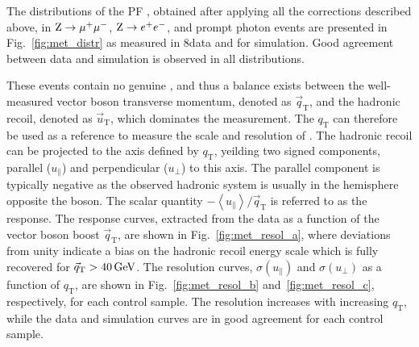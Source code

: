 The distributions of the PF \ETmiss, obtained after applying all the corrections described above, in $\mathrm{Z}\to\mu^+\mu^-$, $\mathrm{Z}\to e^+e^-$, and prompt photon events are presented in Fig.~\ref{fig:met_distr} as measured in 8\TeV data and for simulation. Good agreement between data and simulation is observed in all distributions.

These events contain no genuine \ptvecmiss, and thus a balance exists between the well-measured vector boson transverse momentum, denoted as ${\vec q}_\mathrm{T}$, and the hadronic recoil, denoted as ${\vec u}_\mathrm{T}$,  which dominates the \ptvecmiss measurement. The $q_\mathrm{T}$ can therefore be used as a reference to measure the scale and resolution of \ptvecmiss.
The hadronic recoil can be projected to the axis defined by $q_\mathrm{T}$, yeilding two signed components, parallel ($u_\parallel$) and perpendicular ($u_\perp$) to this axis. The parallel component is typically negative as the observed hadronic system is usually in the hemisphere opposite the boson. The scalar quantity $-\left\langle u_\parallel\right\rangle/{\vec q}_\mathrm{T}$ is referred to as the \ptvecmiss response. The response curves, extracted from the data as a function of the vector boson boost ${\vec q}_\mathrm{T}$, are shown in Fig.~\ref{fig:met_resol_a}, where deviations from unity indicate a bias on the hadronic recoil energy scale which is  fully recovered for ${\vec q}_\mathrm{T} > 40\,\text{Ge\hspace{-.08em}V}$.
The resolution curves, $\sigma(u_\parallel)$ and $\sigma(u_\perp)$ as a function of $q_\mathrm{T}$, are shown in Fig.~\ref{fig:met_resol_b} and~\ref{fig:met_resol_c}, respectively, for each control sample. The resolution increases with increasing $q_\mathrm{T}$, while the data and simulation curves are in good agreement for each control sample.\\

